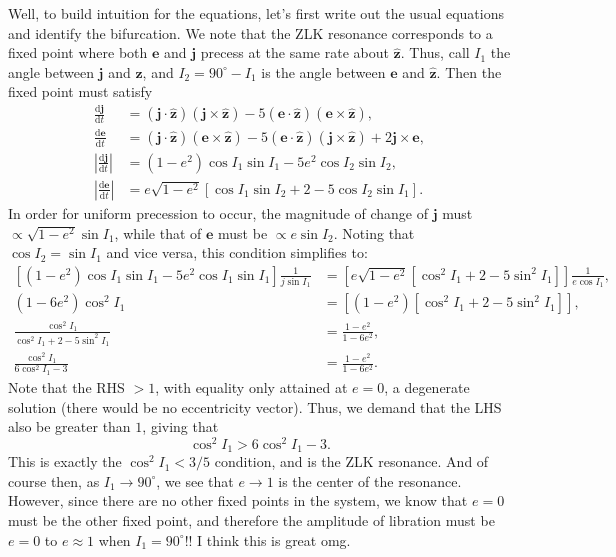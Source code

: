 \documentclass[12pt]{article}
\newcommand*{\rd}[2]{\frac{\mathrm{d}#1}{\mathrm{d}#2}}
\newcommand*{\bm}[1]{\boldsymbol{\mathbf{#1}}}
\newcommand*{\uv}[1]{\hat{\bm{#1}}}
\newcommand*{\abs}[1]{\left|#1\right|}
\newcommand*{\p}[1]{\left(#1\right)}
\newcommand*{\s}[1]{\left[#1\right]}
\begin{document}
Well, to build intuition for the equations, let's first write out the usual
equations and identify the bifurcation.
We note that the ZLK resonance corresponds to a fixed point where both $\bm{e}$
and $\bm{j}$ precess at the same rate about $\uv{z}$.
Thus, call $I_1$ the angle between $\bm{j}$ and $\uv{z}$, and $I_2 = 90^\circ -
I_1$ is the angle between $\bm{e}$ and $\uv{z}$.
Then the fixed point must satisfy
\begin{align}
    \rd{\bm{j}}{t}
        &=
            \p{\bm{j} \cdot \uv{z}} \p{\bm{j} \times \uv{z}}
            - 5 \p{\bm{e} \cdot \uv{z}} \p{\bm{e} \times \uv{z}},\\
    \rd{\bm{e}}{t}
        &=
            \p{\bm{j} \cdot \uv{z}} \p{\bm{e} \times \uv{z}}
            - 5 \p{\bm{e} \cdot \uv{z}} \p{\bm{j} \times \uv{z}}
            + 2\bm{j} \times \bm{e},\label{eq:ZLKbifurc_dedt}\\
    \abs{\rd{\bm{j}}{t}}
        &=
            (1 - e^2)\cos I_1 \sin I_1
                - 5e^2 \cos I_2\sin I_2,\\
    \abs{\rd{\bm{e}}{t}}
        &=
            e\sqrt{1 - e^2}
                \s{\cos I_1 \sin I_2
                    + 2
                    - 5\cos I_2 \sin I_1}.
\end{align}
In order for uniform precession to occur, the magnitude of change of $\bm{j}$
must $\propto \sqrt{1 - e^2}\sin I_1$, while that of $\bm{e}$ must be $\propto
e\sin I_2$.
Noting that $\cos I_2 = \sin I_1$ and vice versa, this condition simplifies to:
\begin{align}
    \s{(1 - e^2)\cos I_1 \sin I_1
               - 5e^2 \cos I_1\sin I_1}\frac{1}{j\sin I_1}
        &=
            \s{e\sqrt{1 - e^2}
                   \s{\cos^2 I_1
                       + 2
                       - 5\sin^2 I_1}}\frac{1}{e\cos I_1},\\
    (1 - 6e^2)\cos^2I_1
        &=
            \s{\p{1 - e^2}
                   \s{\cos^2 I_1
                       + 2
                       - 5\sin^2 I_1}},\\
    \frac{\cos^2 I_1}{
            \cos^2 I_1 + 2 - 5\sin^2 I_1}
        &=
            \frac{1 - e^2}{1 - 6e^2},\\
    \frac{\cos^2 I_1}{
            6\cos^2 I_1 - 3}
        &=
            \frac{1 - e^2}{1 - 6e^2}.
\end{align}
Note that the RHS $> 1$, with equality only attained at $e=0$, a degenerate
solution (there would be no eccentricity vector).
Thus, we demand that the LHS also be greater than $1$, giving that
\begin{equation}
    \cos^2 I_1 > 6\cos^2 I_1 - 3.
\end{equation}
This is exactly the $\cos^2 I_1 < 3/5$ condition, and is the ZLK resonance.
And of course then, as $I_1 \to 90^\circ$, we see that $e \to 1$ is the center
of the resonance.
However, since there are no other fixed points in the system, we know that $e=0$
must be the other fixed point, and therefore the amplitude of libration must be
$e=0$ to $e \approx 1$ when $I_1 = 90^\circ$!!
I think this is great omg.
\end{document}
